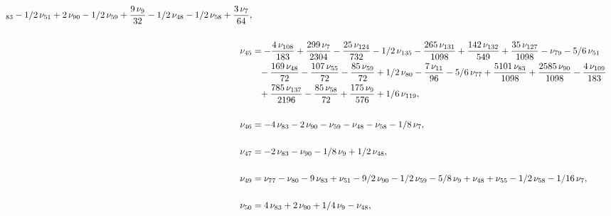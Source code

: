 \documentclass[a4paper,12pt, DIV=14, BCOR=5mm, twoside, headsepline, numbers=noenddot]{scrbook}
\begin{document}
\begin{align}
\begin{aligned}
_{{83}}-1/2\,\nu_{{51}}+2\,\nu_{{90}}-1/2\,\nu_{{59}}+{\frac {9\,\nu_{
{9}}}{32}}-1/2\,\nu_{{48}}-1/2\,\nu_{{58}}+{\frac {3\,\nu_{{7}}}{64}},\\
\\
\nu_{{45}}&=-{\frac {4\,\nu_{{108}}}{183}}+{\frac {299\,\nu_{{7}}}{2304
}}-{\frac {25\,\nu_{{124}}}{732}}-1/2\,\nu_{{135}}-{\frac {265\,\nu_{{
131}}}{1098}}+{\frac {142\,\nu_{{132}}}{549}}+{\frac {35\,\nu_{{127}}
}{1098}}-\nu_{{79}}-5/6\,\nu_{{51}}\\
 &\hphantom{=}-{\frac {169\,\nu_{{48}}}{72}}-{
\frac {107\,\nu_{{55}}}{72}}-{\frac {85\,\nu_{{59}}}{72}}+1/2\,\nu_{{
80}}-{\frac {7\,\nu_{{11}}}{96}}-5/6\,\nu_{{77}}+{\frac {5101\,\nu_{{
83}}}{1098}}+{\frac {2585\,\nu_{{90}}}{1098}}-{\frac {4\,\nu_{{109}}}{
183}}\\
 &\hphantom{=}+{\frac {785\,\nu_{{137}}}{2196}}-{\frac {85\,\nu_{{58}}}{72}}+{
\frac {175\,\nu_{{9}}}{576}}+1/6\,\nu_{{119}}, \\
\\
\nu_{{46}}&=-4\,\nu_{{83}
}-2\,\nu_{{90}}-\nu_{{59}}-\nu_{{48}}-\nu_{{58}}-1/8\,\nu_{{7}},\\
\\
\nu_{{
47}}&=-2\,\nu_{{83}}-\nu_{{90}}-1/8\,\nu_{{9}}+1/2\,\nu_{{48}}, \\
\\
\nu_{{49
}}&=\nu_{{77}}-\nu_{{80}}-9\,\nu_{{83}}+\nu_{{51}}-9/2\,\nu_{{90}}-1/2
\,\nu_{{59}}-5/8\,\nu_{{9}}+\nu_{{48}}+\nu_{{55}}-1/2\,\nu_{{58}}-1/16
\,\nu_{{7}},  \\
\\
\nu_{{50}}&=4\,\nu_{{83}}+2\,\nu_{{90}}+1/4\,\nu_{{9}}-\nu_
{{48}},
\end{aligned}
\end{align}
\end{document}
